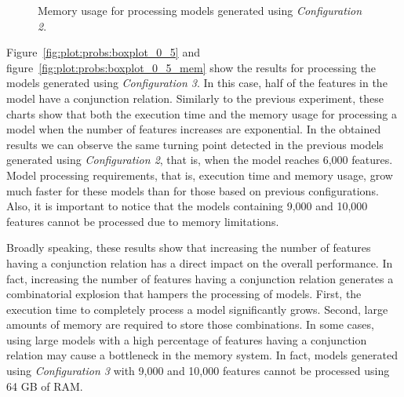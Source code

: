 \begin{figure}[h]
\begin{minipage}[b]{0.48\textwidth}
		\caption{Memory usage for processing models generated using \textit{Configuration 2}.}\label{fig:plot:probs:boxplot_0_2_mem}
	\end{minipage}
\end{figure}

Figure~\ref{fig:plot:probs:boxplot_0_5} and figure~\ref{fig:plot:probs:boxplot_0_5_mem} show the results for processing the models generated using \textit{Configuration 3}. In this case, half of the features in the model have a conjunction relation. Similarly to the previous experiment, these charts show that both the execution time and the memory usage for processing a model when the number of features increases are exponential. In the obtained results we can observe the same turning point detected in the previous models generated using  \textit{Configuration 2}, that is, when the model reaches 6,000 features. Model processing requirements, that is, execution time and memory usage, grow much faster for these models than for those based on previous configurations. Also, it is important to notice that the models containing 9,000 and 10,000 features cannot be processed due to memory limitations.

Broadly speaking, these results show that increasing the number of features having a conjunction relation has a direct impact on the overall performance. In fact, increasing the number of features having a conjunction relation generates a combinatorial explosion that hampers the processing of models. First, the execution time to completely process a model significantly grows. Second, large amounts of memory are required to store those combinations. In some cases, using large models with a high percentage of features having a conjunction relation may cause a bottleneck in the memory system. In fact, models generated using \textit{Configuration 3} with 9,000 and 10,000 features cannot be processed using 64 GB of RAM.


